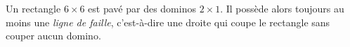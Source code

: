 Un rectangle $6 \times 6$ est pavé par des dominos $2 \times 1$. Il possède alors toujours au moins une \emph{ligne de faille}, c'est-à-dire une droite qui coupe le rectangle sans couper aucun domino.
